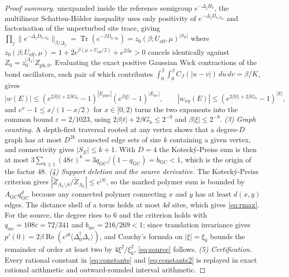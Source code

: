 \documentclass[11pt]{article}
\theoremstyle{definition}
\theoremstyle{remark}
\newcommand{\eff}{\mathrm{eff}}
\newcommand{\Gb}{G_{\mathrm{b}}}
\newcommand{\Ueff}{U_{\eff}}
\begin{document}
\begin{proof}[Proof summary]
unexpanded inside the reference semigroup $e^{-\Delta_j H_0}$, the multilinear
Schatten-H\"older inequality uses only positivity of $e^{-\Delta_j D_{0,S_E}}$ and
factorisation of the unperturbed site trace, giving
$\prod_j\|e^{-\Delta_j D_{0,S_E}}\|_{\beta/\Delta_j}
=\operatorname{Tr}(e^{-\beta D_{0,S_E}})=z_0(\beta;\Ueff,\mu)^{|S_E|}$ where
$z_0(\beta;\Ueff,\mu)=1+2e^{\beta(\mu+\Ueff/2)}+e^{2\beta\mu}>0$ cancels
identically against $Z_0=z_0^{|\Lambda_L|}Z_{\mathrm{ph},0}$. Evaluating the exact
positive Gaussian Wick contractions of the bond oscillators, each pair of which
contributes $\int_0^\beta\int_0^\beta C_\beta(|u-v|)\,du\,dv=\beta/K$, gives
\begin{equation}
|w(E)|\le\left(e^{2\beta|t|+2\beta\Gb}-1\right)^{|E_{\mathrm{phys}}|}
\left(e^{\beta|\xi|}-1\right)^{|E_{\mathrm{src}}|},\qquad
|w_{xy}(E)|\le\left(e^{2\beta|t|+2\beta\Gb}-1\right)^{|E|},
\label{eq:activity}
\end{equation}
and $e^x-1\le x/(1-x/2)$ for $x\in[0,2)$ turns the two exponents into the common
bound $\varepsilon=2/1023$, using $2\beta|t|+2\beta\Gb\le2^{-9}$ and
$\beta|\xi|\le2^{-9}$.
\emph{(3) Graph counting.} A depth-first traversal rooted at any vertex shows that a
degree-$D$ graph has at most $D^{2k}$ connected edge sets of size $k$ containing a
given vertex, and connectivity gives $|S_E|\le k+1$. With $D=4$ the Kotecký-Preiss
sum is then at most $3\sum_{k\ge1}(48\varepsilon)^k=3q_{\mathrm{GC}}/(1-q_{\mathrm{GC}})
=b_{\mathrm{GC}}<1$, which is the origin of the factor $48$.
\emph{(4) Support deletion and the source derivative.} The Kotecký-Preiss criterion
gives $|\widetilde Z_{\Lambda_L\setminus S}/\widetilde Z_{\Lambda_L}|\le e^{|S|}$,
so the marked polymer sum is bounded by $A_{\mathrm{GC}}q_{\mathrm{GC}}^d$ because any
connected polymer connecting $x$ and $y$ has at least $d(x,y)$ edges. The distance
shell of a torus holds at most $4d$ sites, which gives \eqref{eq:rmax}. For the
source, the degree rises to $6$ and the criterion holds with
$q_{\mathrm{src}}=108\varepsilon=72/341$ and $b_{\mathrm{src}}=216/269<1$; since
translation invariance gives
$p'(0)=2\beta\operatorname{Re}(e^{i\theta}\langle\Delta_0^\dagger\Delta_r\rangle)$, and Cauchy's
formula on $|\xi|=\xi_0$ bounds the remainder of order at least two by
$4\xi^2/\xi_0^2$, \eqref{eq:source} follows.
\emph{(5) Certification.} Every rational constant in \eqref{eq:constants} and
\eqref{eq:constants2} is replayed in exact rational arithmetic and outward-rounded
interval arithmetic.
\end{proof}
\end{document}
